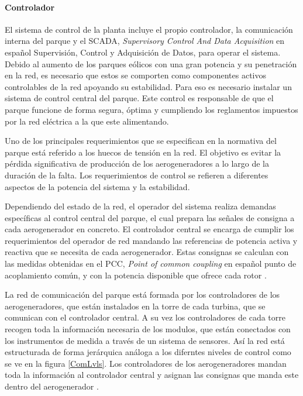 \documentclass{book}
\begin{document}
		\paragraph {Controlador}
		El sistema de control de la planta incluye el propio controlador, la comunicaci\'on interna del parque y el SCADA, \emph{Supervisory Control And Data Acquisition} en español Supervisi\'on, Control y Adquisici\'on de Datos, para operar el sistema. Debido al aumento de los parques e\'olicos con una gran potencia y su penetraci\'on en la red, es necesario que estos se comporten como componentes activos controlables de la red apoyando su estabilidad. Para eso es necesario instalar un sistema de control central del parque. Este control es responsable de que el parque funcione de forma segura, \'optima y cumpliendo los reglamentos impuestos por la red el\'ectrica a la que este alimentando. \par
		Uno de los principales requerimientos que se especifican en la normativa del parque est\'a referido a los huecos de tensi\'on en la red. El objetivo es evitar la p\'erdida significativa de producci\'on de los aerogeneradores a lo largo de la duraci\'on de la falta. Los requerimientos de control se refieren a diferentes aspectos de la potencia del sistema y la estabilidad. \par 
		Dependiendo del estado de la red, el operador del sistema realiza demandas espec\'ificas al control central del parque, el cual prepara las señales de consigna a cada aerogenerador en concreto. El controlador central se encarga de cumplir los requerimientos del operador de red mandando las referencias de potencia activa y reactiva que se necesita de cada aerogenerador. Estas consignas se calculan con las medidas obtenidas en el PCC, \emph{Point of common coupling} en español punto de acoplamiento com\'un, y con la potencia disponible que ofrece cada rotor \cite{WindFarmController}.  \par
		La red de comunicaci\'on del parque est\'a formada por los controladores de los aerogeneradores, que est\'an instalados en la torre de cada turbina, que se comunican con el controlador central.  A su vez los controladores de cada torre recogen toda la informaci\'on necesaria de los modulos, que est\'an conectados con los instrumentos de medida a trav\'es de  un sistema de sensores. As\'i la red est\'a estructurada de forma jer\'arquica an\'aloga a los diferntes niveles de control como se ve en la figura \ref {ComLvls}. Los controladores de los aerogeneradores mandan toda la informaci\'on al controlador central y asignan las consignas que manda este dentro del aerogenerador \cite{ComunicationControl}.  \par
\end{document}
